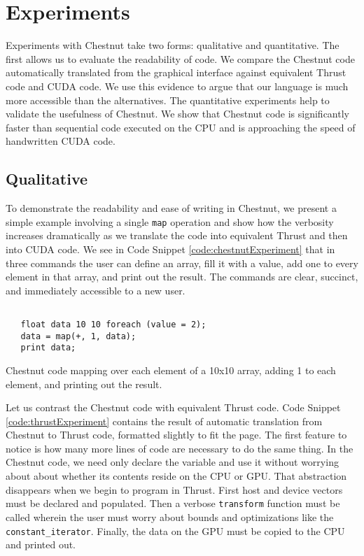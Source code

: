 \documentclass[twocolumn]{article}
\renewcommand{\|}{\origbar} %
\newcommand{\code}[1]{\texttt{#1}}
\begin{document}
\section{Experiments}
\label{sec:experiments}

Experiments with Chestnut take two forms: qualitative and quantitative. The first allows us to evaluate the readability of code. We compare the Chestnut code automatically translated from the graphical interface against equivalent Thrust code and CUDA code. We use this evidence to argue that our language is much more accessible than the alternatives. The quantitative experiments help to validate the usefulness of Chestnut. We show that Chestnut code is significantly faster than sequential code executed on the CPU and is approaching the speed of handwritten CUDA code.

\subsection{Qualitative}

To demonstrate the readability and ease of writing in Chestnut, we present a simple example involving a single \code{map} operation and show how the verbosity increases dramatically as we translate the code into equivalent Thrust and then into CUDA code. We see in Code Snippet \ref{code:chestnutExperiment} that in three commands the user can define an array, fill it with a value, add one to every element in that array, and print out the result. The commands are clear, succinct, and immediately accessible to a new user. 

\begin{Code Snippet}
\begin{verbatim}

   float data 10 10 foreach (value = 2);
   data = map(+, 1, data);
   print data;
\end{verbatim}
\caption{Chestnut code mapping over each element of a 10x10 array, adding 1 to each element, and printing out the result.}
\label{code:chestnutExperiment}
\end{Code Snippet}

Let us contrast the Chestnut code with equivalent Thrust code. Code Snippet \ref{code:thrustExperiment} contains the result of automatic translation from Chestnut to Thrust code, formatted slightly to fit the page. The first feature to notice is how many more lines of code are necessary to do the same thing. In the Chestnut code, we need only declare the variable and use it without worrying about about whether its contents reside on the CPU or GPU. That abstraction disappears when we begin to program in Thrust. First host and device vectors must be declared and populated. Then a verbose \code{transform} function must be called wherein the user must worry about bounds and optimizations like the \code{constant\_iterator}. Finally, the data on the GPU must be copied to the CPU and printed out. 
\end{document}
